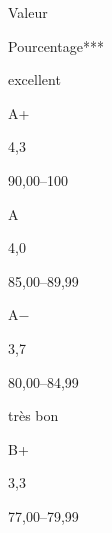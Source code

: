\documentclass [12 pt]{article}
\begin{document}
                            
                                Valeur
                            
                            
                                Pourcentage***
                            
                        
                        
                            
                                excellent
                            
                            
                                A+
                            
                            
                                4,3
                            
                            
                                90,00–100
                            
                        
                        
                            
                                A
                            
                            
                                4,0
                            
                            
                                85,00–89,99
                            
                        
                        
                            
                                A−
                            
                            
                                3,7
                            
                            
                                80,00–84,99
                            
                        
                        
                            
                                très bon
                            
                            
                                B+
                            
                            
                                3,3
                            
                            
                                77,00–79,99
                            
                        
                        
\end{document}
